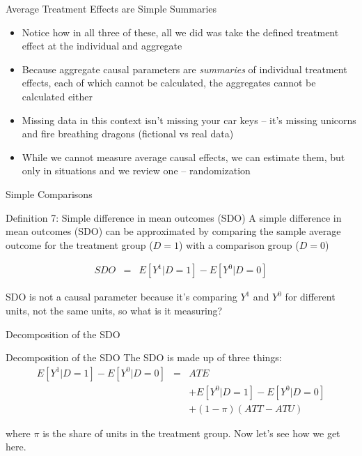 \documentclass{beamer}
\begin{document}
\begin{frame}{Average Treatment Effects are Simple Summaries}

  \begin{itemize}
	\item Notice how in all three of these, all we did was take the defined treatment effect at the individual and aggregate
	\item Because aggregate causal parameters are \emph{summaries} of individual treatment effects, each of which cannot be calculated, the aggregates cannot be calculated either
	\item Missing data in this context isn't missing your car keys -- it's missing unicorns and fire breathing dragons (fictional vs real data)
	\item While we cannot measure average causal effects, we can estimate them, but only in situations and we review one -- randomization
  \end{itemize}

\end{frame}







\begin{frame}{Simple Comparisons}



  \begin{block}{Definition 7: Simple difference in mean outcomes (SDO)}
    A simple difference in mean outcomes (SDO) can be approximated by comparing the sample average outcome for the treatment group ($D=1$) with a comparison group ($D=0$)
    
    \begin{eqnarray*}
      SDO &=& E[Y^1 | D=1] - E[Y^0 | D=0]
    \end{eqnarray*}
  \end{block}
  \bigskip

SDO is not a causal parameter because it's comparing $Y^1$ and $Y^0$ for different units, not the same units, so what is it measuring? 

\end{frame}


\begin{frame}{Decomposition of the SDO}

  \begin{block}{Decomposition of the SDO}
    The SDO is made up of three things:
    \begin{eqnarray*}
      E[Y^1 | D=1] - E[Y^0 | D=0]&=& ATE\nonumber \\
      &&+ E[Y^0|D=1] - E[Y^0|D=0] \nonumber \\
      && + (1-\pi)(ATT - ATU)
    \end{eqnarray*}
  \end{block}

\bigskip

where $\pi$ is the share of units in the treatment group.  Now let's see how we get here.
\end{frame}
\end{document}
